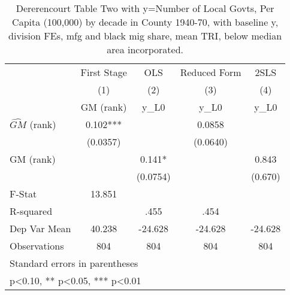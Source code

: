\begin{table}[htbp]\centering
\def\sym#1{\ifmmode^{#1}\else\(^{#1}\)\fi}
\caption{Dererencourt Table Two with y=Number of Local Govts, Per Capita (100,000) by decade in County 1940-70, with baseline y, division FEs, mfg and black mig share, mean TRI, below median area incorporated.}
\begin{tabular}{l*{4}{c}}
\toprule
                    & First Stage   &         OLS   &Reduced Form   &        2SLS   \\
                    &\multicolumn{1}{c}{(1)}&\multicolumn{1}{c}{(2)}&\multicolumn{1}{c}{(3)}&\multicolumn{1}{c}{(4)}\\
                    &\multicolumn{1}{c}{GM  (rank)}&\multicolumn{1}{c}{y\_L0}&\multicolumn{1}{c}{y\_L0}&\multicolumn{1}{c}{y\_L0}\\
\midrule
$\hat{GM}$ (rank)   &       0.102***&               &      0.0858   &               \\
                    &    (0.0357)   &               &    (0.0640)   &               \\
\addlinespace
GM  (rank)          &               &       0.141*  &               &       0.843   \\
                    &               &    (0.0754)   &               &     (0.670)   \\
\midrule
F-Stat              &      13.851   &               &               &               \\
R-squared           &               &        .455   &        .454   &               \\
Dep Var Mean        &      40.238   &     -24.628   &     -24.628   &     -24.628   \\
Observations        &         804   &         804   &         804   &         804   \\
\bottomrule
\multicolumn{5}{l}{\footnotesize Standard errors in parentheses}\\
\multicolumn{5}{l}{\footnotesize * p<0.10, ** p<0.05, *** p<0.01}\\
\end{tabular}
\end{table}
